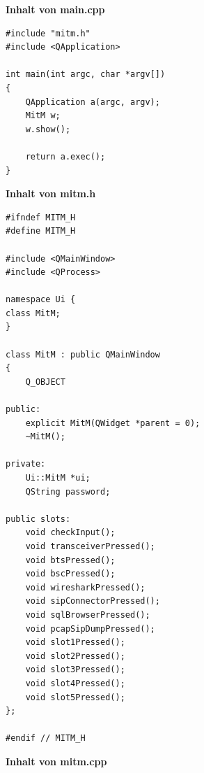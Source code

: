 \textbf{Inhalt von main.cpp}

\begin{lstlisting}
#include "mitm.h"
#include <QApplication>

int main(int argc, char *argv[])
{
    QApplication a(argc, argv);
    MitM w;
    w.show();

    return a.exec();
}
\end{lstlisting}




\textbf{Inhalt von mitm.h}

\begin{lstlisting}
#ifndef MITM_H
#define MITM_H

#include <QMainWindow>
#include <QProcess>

namespace Ui {
class MitM;
}

class MitM : public QMainWindow
{
    Q_OBJECT

public:
    explicit MitM(QWidget *parent = 0);
    ~MitM();

private:
    Ui::MitM *ui;
    QString password;

public slots:
    void checkInput();
    void transceiverPressed();
    void btsPressed();
    void bscPressed();
    void wiresharkPressed();
    void sipConnectorPressed();
    void sqlBrowserPressed();
    void pcapSipDumpPressed();
    void slot1Pressed();
    void slot2Pressed();
    void slot3Pressed();
    void slot4Pressed();
    void slot5Pressed();
};

#endif // MITM_H
\end{lstlisting}




\textbf{Inhalt von mitm.cpp}

